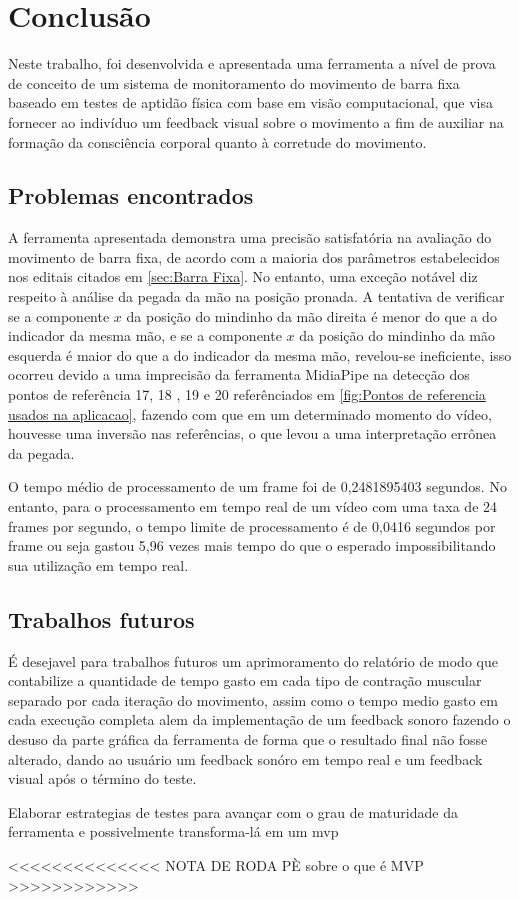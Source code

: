 \chapter{Conclusão}

Neste trabalho, foi desenvolvida e apresentada uma ferramenta a nível de prova de conceito de um sistema de monitoramento do movimento de barra fixa baseado em testes de aptidão física com base em visão computacional, que visa fornecer ao indivíduo um feedback visual sobre o movimento a fim de auxiliar na formação da consciência corporal quanto à corretude do movimento.


\section[Problemas encontrados]{Problemas encontrados}\label{sec:Pontos fracos e possiveis melhorias}

A ferramenta apresentada demonstra uma precisão satisfatória na avaliação do movimento de barra fixa, de acordo com a maioria dos parâmetros estabelecidos nos editais citados em \ref{sec:Barra Fixa}. No entanto, uma exceção notável diz respeito à análise da pegada da mão na posição pronada. A tentativa de verificar se a componente $x$ da posição do mindinho da mão direita é menor do que a do indicador da mesma mão, e se a componente $x$ da posição do mindinho da mão esquerda é maior do que a do indicador da mesma mão, revelou-se ineficiente, isso ocorreu devido a uma imprecisão da ferramenta MidiaPipe na detecção dos pontos de referência 17, 18 , 19 e 20 referênciados em \ref{fig:Pontos de referencia usados na aplicacao}, fazendo com que em um determinado momento do vídeo, houvesse uma inversão nas referências, o que levou a uma interpretação errônea da pegada.

O tempo médio de processamento de um frame foi de 0,2481895403 segundos. No entanto, para o processamento em tempo real de um vídeo com uma taxa de 24 frames por segundo, o tempo limite de processamento é de 0,0416 segundos por frame ou seja gastou 5,96 vezes mais tempo do que o esperado impossibilitando sua utilização em tempo real.






\section[Trabalhos futuros]{Trabalhos futuros}
É desejavel para trabalhos futuros um aprimoramento do relatório de modo que contabilize a quantidade de tempo gasto em cada tipo de contração muscular separado por cada iteração do movimento, assim como o tempo medio gasto em cada execução completa alem da implementação de um feedback sonoro fazendo o desuso da parte gráfica da ferramenta de forma que o resultado final não fosse alterado, dando ao usuário um feedback sonóro em tempo real e um feedback visual após o término do teste. 

Elaborar estrategias  de testes para avançar com o grau de maturidade da ferramenta e possivelmente transforma-lá em um mvp 


<<<<<<<<<<<<<< NOTA DE RODA PÈ  sobre o que é MVP  >>>>>>>>>>>>
